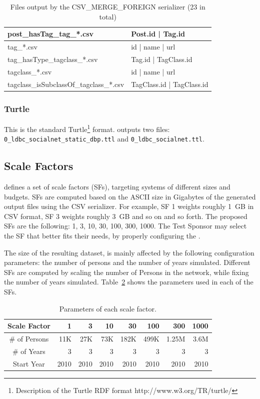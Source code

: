 \begin{table}[htbp]
{\begin{tabular}{|p{4.3cm}|p{12.4cm}|}
        \hline
        post\_hasTag\_tag\_*.csv & Post.id | Tag.id \\
        \hline
        tag\_*.csv & id | name | url \\
        \hline
        tag\_hasType\_tagclass\_*.csv & Tag.id | TagClass.id \\
        \hline
        tagclass\_*.csv & id | name | url \\
        \hline
        tagclass\_isSubclassOf\_tagclass\_*.csv & TagClass.id | TagClass.id \\
        \hline
    \end{tabular}}
    \caption{Files output by the CSV\_MERGE\_FOREIGN serializer (23 in total)}
    \label{table:csv_merge_foreign}
\end{table}

\subsubsection{Turtle}

This is the standard Turtle\footnote{Description of
the Turtle RDF format http://www.w3.org/TR/turtle/} format. \datagen outputs
two files: \texttt{0\_ldbc\_socialnet\_static\_dbp.ttl} and \texttt{0\_ldbc\_socialnet.ttl}.

\subsection{Scale Factors}

\ldbcsnb defines a set of scale factors (SFs), targeting systems of different
sizes and budgets.  SFs are computed based on the ASCII size in Gigabytes of
the generated output files using the CSV serializer. For example, SF 1 weights roughly 1~GB in CSV
format, SF 3 weights roughly 3~GB and so on and so forth.  The proposed SFs are
the following: 1, 3, 10, 30, 100, 300, 1000. The Test Sponsor may select the SF
that better fits their needs, by properly configuring the \datagen.

The size of the resulting dataset, is mainly affected by the following
configuration parameters: the number of persons and the number of years
simulated. Different SFs are computed by scaling the number of Persons in
the network, while fixing the number of years simulated.
Table~\ref{tab:snsize} shows the parameters used in each of the SFs.

\begin{table}[H]
\centering
\begin{tabular}{|c||r|r|r|r|r|r|r|}
\hline  Scale Factor  & 1 &  3 & 10 & 30 & 100 & 300 & 1000 \\
\hline  \# of Persons  & 11K &  27K & 73K & 182K & 499K & 1.25M & 3.6M \\
\hline  \# of Years  & 3 &  3 & 3 & 3 & 3 & 3 & 3 \\
\hline  Start Year & 2010 &  2010 & 2010 & 2010 & 2010 & 2010 & 2010 \\
\hline
\end{tabular}
\centering
\caption{Parameters of each scale factor.}
\label{tab:snsize}
\end{table}

